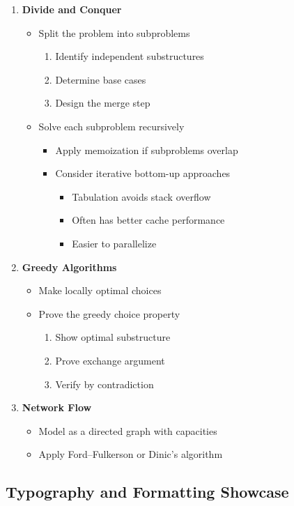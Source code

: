 \begin{enumerate}
\item \textbf{Divide and Conquer}
  \begin{itemize}
  \item Split the problem into subproblems
    \begin{enumerate}
    \item Identify independent substructures
    \item Determine base cases
    \item Design the merge step
    \end{enumerate}
  \item Solve each subproblem recursively
    \begin{itemize}
    \item Apply memoization if subproblems overlap
    \item Consider iterative bottom-up approaches
      \begin{itemize}
      \item Tabulation avoids stack overflow
      \item Often has better cache performance
      \item Easier to parallelize
      \end{itemize}
    \end{itemize}
  \end{itemize}
\item \textbf{Greedy Algorithms}
  \begin{itemize}
  \item Make locally optimal choices
  \item Prove the greedy choice property
    \begin{enumerate}
    \item Show optimal substructure
    \item Prove exchange argument
    \item Verify by contradiction
    \end{enumerate}
  \end{itemize}
\item \textbf{Network Flow}
  \begin{itemize}
  \item Model as a directed graph with capacities
  \item Apply Ford--Fulkerson or Dinic's algorithm
  \end{itemize}
\end{enumerate}

\subsection{Typography and Formatting Showcase}

